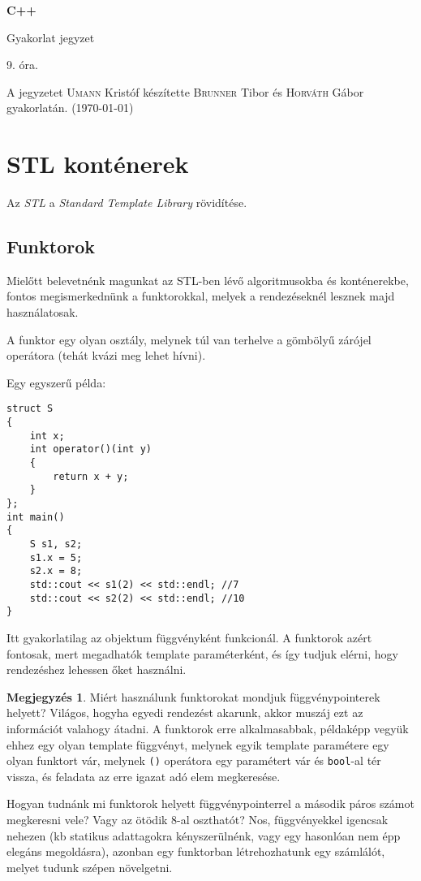 \documentclass[a4paper,11.5pt,table]{article}
\begin{document}
	\setlength\parindent{0pt}
	\def\<{<\hspace{0mm}<}
	
	\theoremstyle{definition}
	\newtheorem{note}{Megjegyzés}[subsection]
	
	\begin{center}
		{\LARGE\textbf{C++}}
		
		{\Large Gyakorlat jegyzet}
		
		9. óra.
	\end{center}
	A jegyzetet \textsc{Umann} Kristóf készítette \textsc{Brunner} Tibor és \textsc{Horváth} Gábor gyakorlatán. (\today)
	
	\section{STL konténerek}

	Az \textit{STL} a \textit{Standard Template Library} rövidítése.
	\subsection{Funktorok}
	Mielőtt belevetnénk magunkat az STL-ben lévő algoritmusokba és konténerekbe, fontos megismerkednünk a funktorokkal, melyek a rendezéseknél lesznek majd használatosak.
	\medskip
	
	A funktor egy olyan osztály, melynek túl van terhelve a gömbölyű zárójel operátora (tehát kvázi meg lehet hívni).
	
	\smallskip
	Egy egyszerű példa:
	\begin{lstlisting}
struct S
{
	int x;
	int operator()(int y)
	{
		return x + y;
	}
};
int main()
{
	S s1, s2;
	s1.x = 5;
	s2.x = 8;
	std::cout << s1(2) << std::endl; //7
	std::cout << s2(2) << std::endl; //10
}
	\end{lstlisting}
	Itt gyakorlatilag az objektum függvényként funkcionál. A funktorok azért fontosak, mert megadhatók template paraméterként, és így tudjuk elérni, hogy rendezéshez lehessen őket használni.
	\begin{note}
	Miért használunk funktorokat mondjuk függvénypointerek helyett? Világos, hogyha egyedi rendezést akarunk, akkor muszáj ezt az információt valahogy átadni. A funktorok erre alkalmasabbak, példaképp vegyük ehhez egy olyan template függvényt, melynek egyik template paramétere egy olyan funktort vár, melynek \texttt{()} operátora egy paramétert vár és \texttt{bool}-al tér vissza, és feladata az erre igazat adó elem megkeresése. 
	
	Hogyan tudnánk mi funktorok helyett függvénypointerrel a második páros számot megkeresni vele? Vagy az ötödik 8-al oszthatót? Nos, függvényekkel igencsak nehezen (kb statikus adattagokra kényszerülnénk, vagy egy hasonlóan nem épp elegáns megoldásra), azonban egy funktorban létrehozhatunk egy számlálót, melyet tudunk szépen növelgetni.
	\end{note}
	
\end{document}
